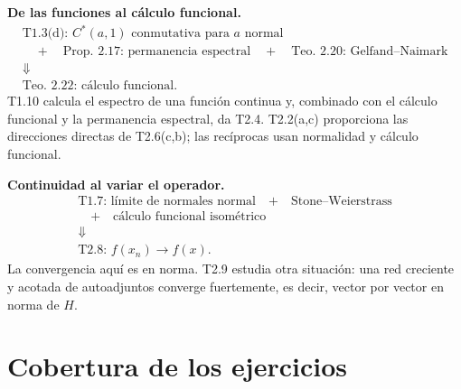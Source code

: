 \begin{dependencias}
\textbf{De las funciones al cálculo funcional.}
\[
\begin{gathered}
\boxed{\text{T1.3(d): }C^*(a,1)\text{ conmutativa para $a$ normal}}\\[2mm]
\quad+\quad
\boxed{\text{Prop. 2.17: permanencia espectral}}
\quad+\quad
\boxed{\text{Teo. 2.20: Gelfand--Naimark}}\\[2mm]
\Downarrow\\[2mm]
\boxed{\text{Teo. 2.22: cálculo funcional}}.
\end{gathered}
\]
T1.10 calcula el espectro de una función continua y, combinado con el cálculo funcional y la
permanencia espectral, da T2.4. T2.2(a,c) proporciona las direcciones directas de T2.6(c,b);
las recíprocas usan normalidad y cálculo funcional.
\end{dependencias}

\begin{dependencias}
\textbf{Continuidad al variar el operador.}
\[
\begin{gathered}
\boxed{\text{T1.7: límite de normales normal}}
\quad+\quad
\boxed{\text{Stone--Weierstrass}}\\[2mm]
\quad+\quad
\boxed{\text{cálculo funcional isométrico}}\\[2mm]
\Downarrow\\[2mm]
\boxed{\text{T2.8: }f(x_n)\to f(x)}.
\end{gathered}
\]
La convergencia aquí es en norma. T2.9 estudia otra situación: una red creciente y acotada de
autoadjuntos converge fuertemente, es decir, vector por vector en norma de $H$.
\end{dependencias}

\section{Cobertura de los ejercicios}

